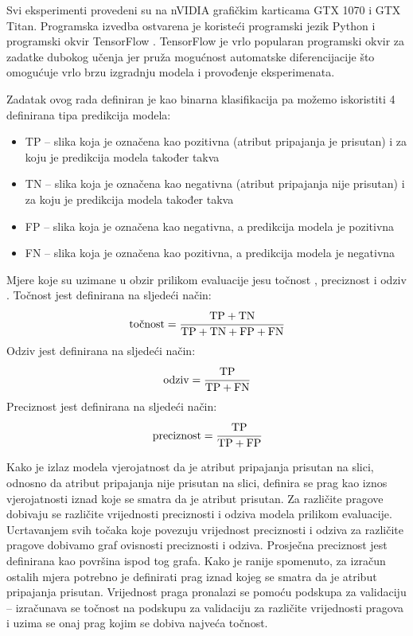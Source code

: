 \documentclass[times, utf8, diplomski, numeric]{fer}
\begin{document}
Svi eksperimenti provedeni su na nVIDIA grafičkim karticama GTX 1070 i GTX Titan. 
Programska izvedba ostvarena je koristeći programski jezik Python i programski okvir TensorFlow \citep{framework:tensorflow}.
TensorFlow je vrlo popularan programski okvir za zadatke dubokog učenja jer pruža mogućnost automatske diferencijacije što omogućuje vrlo brzu izgradnju modela i provođenje eksperimenata.

Zadatak ovog rada definiran je kao binarna klasifikacija pa možemo iskoristiti 4 definirana tipa predikcija modela: 
\begin{itemize}
 \item TP  -- slika koja je označena kao pozitivna (atribut pripajanja je prisutan) i za koju je predikcija modela također takva 
 \item TN  -- slika koja je označena kao negativna (atribut pripajanja nije prisutan) i za koju je predikcija modela također takva
 \item FP  -- slika koja je označena kao negativna, a predikcija modela je pozitivna
 \item FN  -- slika koja je označena kao pozitivna, a predikcija modela je negativna
\end{itemize}
Mjere koje su uzimane u obzir prilikom evaluacije jesu točnost , preciznost  i odziv . 
Točnost jest definirana na sljedeći način:
\begin{align}
 \text{točnost} = \cfrac{\text{TP} + \text{TN}}{\text{TP} + \text{TN} + \text{FP} + \text{FN}}
\end{align}
Odziv jest definirana na sljedeći način:
\begin{align}
 \text{odziv} = \cfrac{\text{TP}}{\text{TP} + \text{FN}}
\end{align}
Preciznost jest definirana na sljedeći način:
\begin{align}
 \text{preciznost} = \cfrac{\text{TP}}{\text{TP} + \text{FP}}
\end{align}

Kako je izlaz modela vjerojatnost da je atribut pripajanja prisutan na slici, odnosno da atribut pripajanja nije prisutan na slici, definira se prag kao iznos vjerojatnosti iznad koje se smatra da je atribut prisutan.
Za različite pragove dobivaju se različite vrijednosti preciznosti i odziva modela prilikom evaluacije. 
Ucrtavanjem svih točaka koje povezuju vrijednost preciznosti i odziva za različite pragove dobivamo graf ovisnosti preciznosti i odziva.
Prosječna preciznost jest definirana kao površina ispod tog grafa.
Kako je ranije spomenuto, za izračun ostalih mjera potrebno je definirati prag iznad kojeg se smatra da je atribut pripajanja prisutan.
Vrijednost praga pronalazi se pomoću podskupa za validaciju -- izračunava se točnost na podskupu za validaciju za različite vrijednosti pragova i uzima se onaj prag kojim se dobiva najveća točnost.
\end{document}
